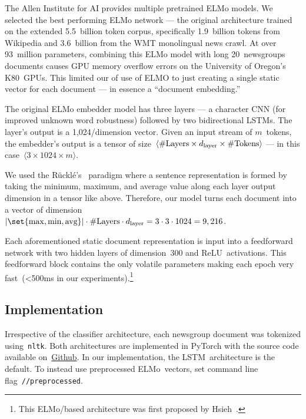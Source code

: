 The Allen Institute for AI provides multiple pretrained ELMo models.  We selected the best performing ELMo network --- the original architecture trained on the extended 5.5~billion token corpus, specifically 1.9~billion tokens from Wikipedia and 3.6~billion from the WMT monolingual news crawl. At over 93~million parameters, combining this ELMo model with long 20~newsgroups documents causes GPU memory overflow errors on the University of Oregon's K80~GPUs.  This limited our of use of ELMO to just creating a single static vector for each document --- in essence a ``document embedding.''

The original ELMo embedder model has three layers --- a character CNN (for improved unknown word robustness) followed by two bidirectional LSTMs.  The layer's output is a 1,024\-/dimension vector.  Given an input stream of $m$~tokens, the embedder's output is a tensor of size~${\langle \textnormal{\#Layers} \times d_{\textnormal{layer}} \times \textnormal{\#Tokens} \rangle}$ --- in this case~${\langle 3 \times 1024 \times m \rangle}$.

We used the R\"{u}ckl\'{e}\etal's~\cite{Ruckle:2018} paradigm where a sentence representation is formed by taking the minimum, maximum, and average value along each layer output dimension in a tensor like above. Therefore, our model turns each document into a vector of dimension ${\abs{\set{\max,\min,\textnormal{avg}}} \cdot \textnormal{\#Layers} \cdot d_{\textnormal{layer}} = 3 \cdot 3 \cdot 1024 = 9,216}$.

Each aforementioned static document representation is input into a feedforward network with two hidden layers of dimension~300 and ReLU~activations. This feedforward block contains the only volatile parameters making each epoch very fast~(<500ms in our experiments).\footnote{This ELMo\-/based architecture was first proposed by Hsieh\etal~\cite{Hsieh:2018}.}

\subsection{Implementation}

Irrespective of the classifier architecture, each newsgroup document was tokenized using~\texttt{nltk}. Both architectures are implemented in PyTorch with the source code available on~\href{\sourceCode}{Github}.  In our implementation, the LSTM~architecture is the default. To instead use preprocessed ELMo~vectors, set command line flag~\texttt{\mbox{\-/\-/preprocessed}}.
